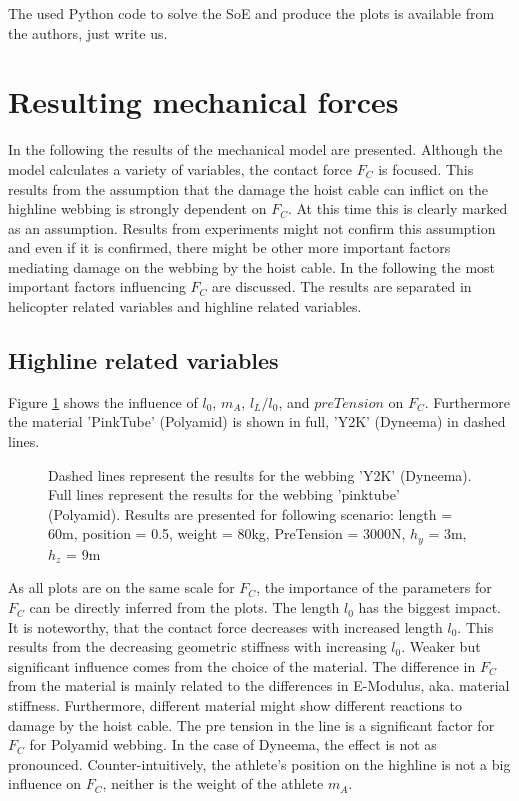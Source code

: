 \documentclass[a4paper,10pt]{scrartcl}
\begin{document}
The used Python code to solve the SoE and produce the plots is available from the authors, just write us.

\section{Resulting mechanical forces}

In the following the results of the mechanical model are presented. Although the model calculates a variety of variables, the contact force $F_C$ is focused. This results from the assumption that the damage the hoist cable can inflict on the highline webbing is strongly dependent on $F_C$. At this time this is clearly marked as an assumption. Results from experiments might not confirm this assumption and even if it is confirmed, there might be other more important factors mediating damage on the webbing by the hoist cable. In the following the most important factors influencing $F_C$ are discussed. The results are separated in helicopter related variables and highline related variables.

\subsection{Highline related variables}
Figure \ref{fig::highline::vars} shows the influence of $l_0$, $m_A$, $l_L/l_0$, and $preTension$ on $F_C$. Furthermore the material 'PinkTube' (Polyamid) is shown in full, 'Y2K' (Dyneema) in dashed lines.  
\begin{figure}[ht]
\centering

\caption{Dashed lines represent the results for the webbing 'Y2K' (Dyneema). Full lines represent the results for the webbing 'pinktube' (Polyamid). Results are presented for following scenario: length = 60m, position = 0.5, weight = 80kg, PreTension = 3000N, $h_y$ = 3m, $h_z$ = 9m}
\label{fig::highline::vars}
\end{figure}

As all plots are on the same scale for $F_C$, the importance of the parameters for $F_C$ can be directly inferred from the plots. The length $l_0$ has the biggest impact. It is noteworthy, that the contact force decreases with increased length $l_0$. This results from the decreasing geometric stiffness with increasing $l_0$.
Weaker but significant influence comes from the choice of the material. The difference in $F_C$ from the material is mainly related to the differences in E-Modulus, aka. material stiffness. Furthermore, different material might show different reactions to damage by the hoist cable.
The pre tension in the line is a significant factor for $F_C$ for Polyamid webbing. In the case of Dyneema, the effect is not as pronounced.
Counter-intuitively, the athlete's position on the highline is not a big influence on $F_C$, neither is the weight of the athlete $m_A$.
\end{document}
